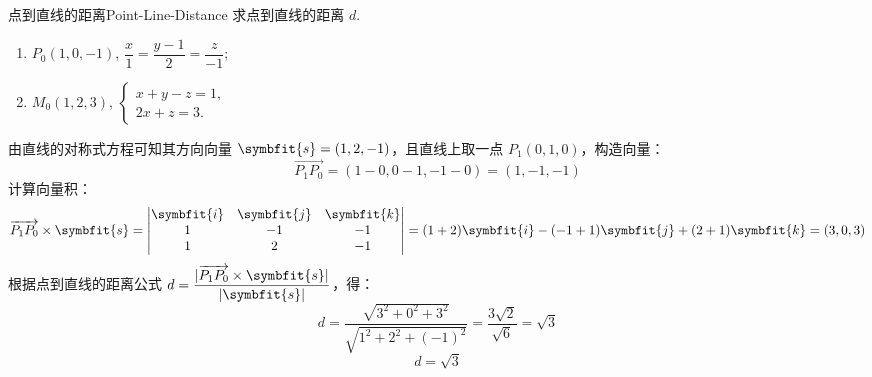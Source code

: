 \begin{problem}{点到直线的距离}{Point-Line-Distance}
    求点到直线的距离 $d$.
    \begin{enumerate}
        \item $P_0(1, 0, -1)$, $\dfrac{x}{1} = \dfrac{y-1}{2} = \dfrac{z}{-1}$;
        \item $M_0(1, 2, 3)$, $\begin{cases} x + y - z = 1, \\ 2x + z = 3. \end{cases}$
    \end{enumerate}
\end{problem}

\begin{solution}

    由直线的对称式方程可知其方向向量 $\symbfit{s} = (1, 2, -1)$，且直线上取一点 $P_1(0, 1, 0)$，构造向量：
    \begin{equation}
        \overrightarrow{P_1P_0} = (1 - 0, 0 - 1, -1 - 0) = (1, -1, -1)
    \end{equation}
    计算向量积：
    \begin{equation}
        \overrightarrow{P_1P_0} \times \symbfit{s} = \begin{vmatrix} \symbfit{i} & \symbfit{j} & \symbfit{k} \\ 1 & -1 & -1 \\ 1 & 2 & -1 \end{vmatrix} = (1 + 2)\symbfit{i} - (-1 + 1)\symbfit{j} + (2 + 1)\symbfit{k} = (3, 0, 3)
    \end{equation}
    根据点到直线的距离公式 $d = \dfrac{|\overrightarrow{P_1P_0} \times \symbfit{s}|}{|\symbfit{s}|}$，得：
    \begin{equation}
        d = \frac{\sqrt{3^2 + 0^2 + 3^2}}{\sqrt{1^2 + 2^2 + (-1)^2}} = \frac{3\sqrt{2}}{\sqrt{6}} = \sqrt{3}
    \end{equation}
    \begin{equation}
        \boxed{d = \sqrt{3}}
    \end{equation}



\end{solution}
